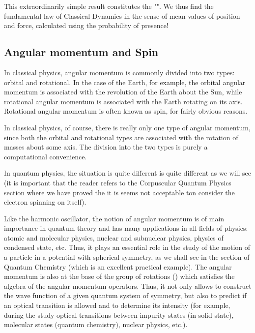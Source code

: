 	This extraordinarily simple result constitutes the "". We thus find the fundamental law of Classical Dynamics in the sense of mean values of position and force, calculated using the probability of presence!
	
	\pagebreak
	\subsection{Angular momentum and Spin}\label{angular momentum and spin}
	In classical physics, angular momentum is commonly divided into two types: orbital and rotational. In the case of the Earth, for example, the orbital angular momentum is associated with the revolution of the Earth about the Sun, while rotational angular momentum is associated with the Earth rotating on its axis. Rotational angular momentum is often known as spin, for fairly obvious reasons.

	In classical physics, of course, there is really only one type of angular momentum, since both the orbital and rotational types are associated with the rotation of masses about some axis. The division into the two types is purely a computational convenience.
	
	In quantum physics, the situation is quite different is quite different as we will see (it is important that the reader refers to the Corpuscular Quantum Physics section where we have proved the it is seems not acceptable ton consider the electron spinning on itself).

	Like the harmonic oscillator, the notion of angular momentum is of main importance in quantum theory and has many applications in all fields of physics: atomic and molecular physics, nuclear and subnuclear physics, physics of condensed state, etc. Thus, it plays an essential role in the study of the motion of a particle in a potential with spherical symmetry, as we shall see in the section of Quantum Chemistry (which is an excellent practical example). The angular momentum is also at the base of the group of rotations () which satisfies the algebra of the angular momentum operators. Thus, it not only allows to construct the wave function of a given quantum system of symmetry, but also to predict if an optical transition is allowed and to determine its intensity (for example, during the study optical transitions between impurity states (in solid state), molecular states (quantum chemistry), nuclear physics, etc.).
	
